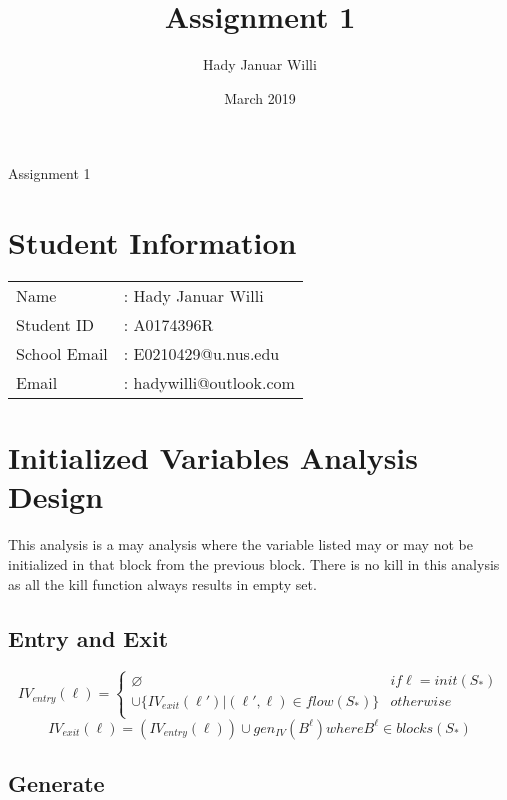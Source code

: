 \documentclass[11pt,a4paper,fleqn]{article}
\title{Assignment 1}
\author{Hady Januar Willi}
\date{March 2019}
\begin{document}
   \begin{center}
      \LARGE Assignment 1
   \end{center}
   \section{Student Information}

   \begin{tabular}{l l} 
      Name           & : Hady Januar Willi      \\ 
      Student ID     & : A0174396R              \\
      School Email   & : E0210429@u.nus.edu     \\
      Email          & : hadywilli@outlook.com  \\
   \end{tabular}
   
   \section{Initialized Variables Analysis Design}

   This analysis is a may analysis where the variable listed may or may not be initialized in that block from the previous block. 
   There is no kill in this analysis as all the kill function always results in empty set.

   \subsection{Entry and Exit}

   \begin{equation}
      IV_{entry}(\ell)=
      \begin{cases} 
         \varnothing & if \ell = init(S_*) \\ 
         \cup \{ IV_{exit}(\ell')|(\ell',\ell) \in flow(S_*) \} & otherwise \\   
      \end{cases}
   \end{equation}
   \begin{equation}
      IV_{exit}(\ell)=(IV_{entry}(\ell)) \cup gen_{IV}(B^{\ell}) where B^{\ell} \in blocks(S_*)
   \end{equation}
   
   \subsection{Generate}
\end{document}
